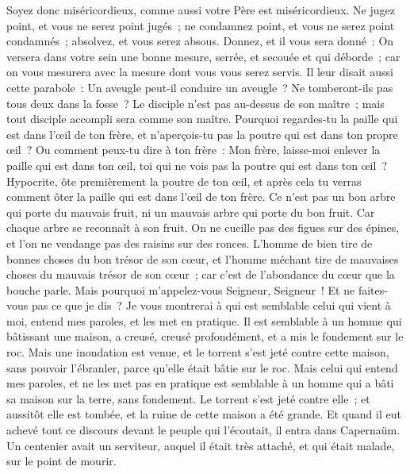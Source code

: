 \begin{multicols}{2}
Soyez donc miséricordieux, comme aussi votre Père est miséricordieux.
Ne jugez point, et vous ne serez point jugés~; ne condamnez point, et vous ne serez point condamnés~; absolvez, et vous serez absous.
Donnez, et il vous sera donné~: On versera dans votre sein une bonne mesure, serrée, et secouée et qui déborde~; car on vous mesurera avec la mesure dont vous vous serez servis.
Il leur disait aussi cette parabole~: Un aveugle peut-il conduire un aveugle~? Ne tomberont-ils pas tous deux dans la fosse~?
Le disciple n'est pas au-dessus de son maître~; mais tout disciple accompli sera comme son maître.
Pourquoi regardes-tu la paille qui est dans l'œil de ton frère, et n'aperçois-tu pas la poutre qui est dans ton propre œil~?
Ou comment peux-tu dire à ton frère~: Mon frère, laisse-moi enlever la paille qui est dans ton œil, toi qui ne vois pas la poutre qui est dans ton œil~? Hypocrite, ôte premièrement la poutre de ton œil, et après cela tu verras comment ôter la paille qui est dans l'œil de ton frère.
Ce n'est pas un bon arbre qui porte du mauvais fruit, ni un mauvais arbre qui porte du bon fruit.
Car chaque arbre se reconnaît à son fruit. On ne cueille pas des figues sur des épines, et l'on ne vendange pas des raisins sur des ronces.
L'homme de bien tire de bonnes choses du bon trésor de son cœur, et l'homme méchant tire de mauvaises choses du mauvais trésor de son cœur~; car c'est de l'abondance du cœur que la bouche parle.
Mais pourquoi m'appelez-vous Seigneur, Seigneur~! Et ne faites-vous pas ce que je dis~?
Je vous montrerai à qui est semblable celui qui vient à moi, entend mes paroles, et les met en pratique.
Il est semblable à un homme qui bâtissant une maison, a creusé, creusé profondément, et a mis le fondement sur le roc. Mais une inondation est venue, et le torrent s'est jeté contre cette maison, sans pouvoir l'ébranler, parce qu'elle était bâtie sur le roc.
Mais celui qui entend mes paroles, et ne les met pas en pratique est semblable à un homme qui a bâti sa maison sur la terre, sans fondement. Le torrent s'est jeté contre elle~; et aussitôt elle est tombée, et la ruine de cette maison a été grande.
\VerseOne{}Et quand il eut achevé tout ce discours devant le peuple qui l'écoutait, il entra dans Capernaüm.
Un centenier avait un serviteur, auquel il était très attaché, et qui était malade, sur le point de mourir.

\end{multicols}
